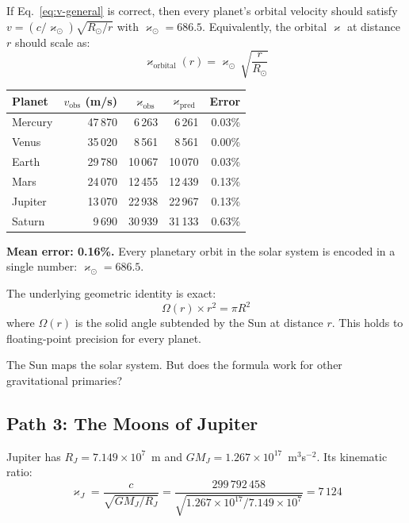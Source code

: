 \documentclass[twocolumn,epjc3]{svjour3}
\newcommand{\kop}{\varkappa}  %
\begin{document}
If Eq.~\eqref{eq:v-general} is correct, then every planet's orbital velocity should satisfy $v = (c/\kop_\odot)\sqrt{R_\odot/r}$ with $\kop_\odot = 686.5$.  Equivalently, the orbital $\kop$ at distance $r$ should scale as:
\begin{equation}\label{eq:k-scaling}
  \kop_{\text{orbital}}(r) = \kop_\odot\,\sqrt{\frac{r}{R_\odot}}
\end{equation}

\begin{center}
\small
\begin{tabular}{lrrrr}
\toprule
\textbf{Planet} & $v_{\text{obs}}$ (m/s) & $\kop_{\text{obs}}$ & $\kop_{\text{pred}}$ & Error \\
\midrule
Mercury & 47\,870 & 6\,263 & 6\,261 & 0.03\% \\
Venus   & 35\,020 & 8\,561 & 8\,561 & 0.00\% \\
Earth   & 29\,780 & 10\,067 & 10\,070 & 0.03\% \\
Mars    & 24\,070 & 12\,455 & 12\,439 & 0.13\% \\
Jupiter & 13\,070 & 22\,938 & 22\,967 & 0.13\% \\
Saturn  &  9\,690 & 30\,939 & 31\,133 & 0.63\% \\
\bottomrule
\end{tabular}
\end{center}

\textbf{Mean error: 0.16\%.}  Every planetary orbit in the solar system is encoded in a single number: $\kop_\odot = 686.5$.

The underlying geometric identity is exact:
\begin{equation}\label{eq:steradian}
  \Omega(r) \times r^2 = \pi R^2
\end{equation}
where $\Omega(r)$ is the solid angle subtended by the Sun at distance $r$.  This holds to floating-point precision for every planet.

The Sun maps the solar system.  But does the formula work for other gravitational primaries?


\subsection{Path 3: The Moons of Jupiter}
\label{sec:path3}

Jupiter has $R_J = 7.149 \times 10^7$~m and $GM_J = 1.267 \times 10^{17}$~m$^3$s$^{-2}$.  Its kinematic ratio:
\begin{equation}
  \kop_J = \frac{c}{\sqrt{GM_J/R_J}} = \frac{299\,792\,458}{\sqrt{1.267\!\times\!10^{17}/7.149\!\times\!10^{7}}} = 7\,124
\end{equation}
\end{document}
